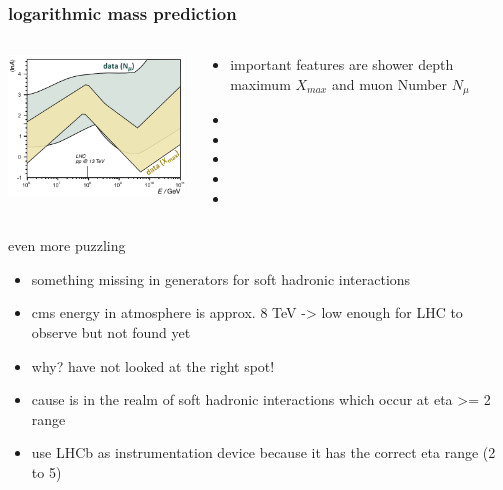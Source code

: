 \documentclass[aspectratio=1610, 9pt]{beamer}
\begin{document}
\begin{frame}\frametitle{logarithmic mass prediction}
  \begin{columns}
    \begin{column}[c]{0.48\textwidth}
      \includegraphics{lnA_right.png}
    \end{column}
    \begin{column}[c]{0.48\textwidth}
      \begin{itemize}
        \item important features are shower depth maximum $X_{max}$ and muon Number $N_{\mu}$
        \item
        \item
        \item
        \item
        \item
      \end{itemize}
    \end{column}
  \end{columns}
\end{frame}

\begin{frame}{even more puzzling}
  \begin{itemize}
    \item something missing in generators for soft hadronic interactions
    \item cms energy in atmosphere is approx. 8 TeV -> low enough for LHC to observe but not found yet
    \item why? have not looked at the right spot!
    \item cause is in the realm of soft hadronic interactions which occur at eta >= 2 range
    \item use LHCb as instrumentation device because it has the correct eta range (2 to 5)
  \end{itemize}
\end{frame}
\end{document}
